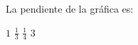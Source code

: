La pendiente de la gráfica es:

\begin{oneparchoices}
    \choice $1$
    \CorrectChoice $\frac{1}{3}$
    \choice $\frac{1}{4}$
    \choice $3$
\end{oneparchoices}